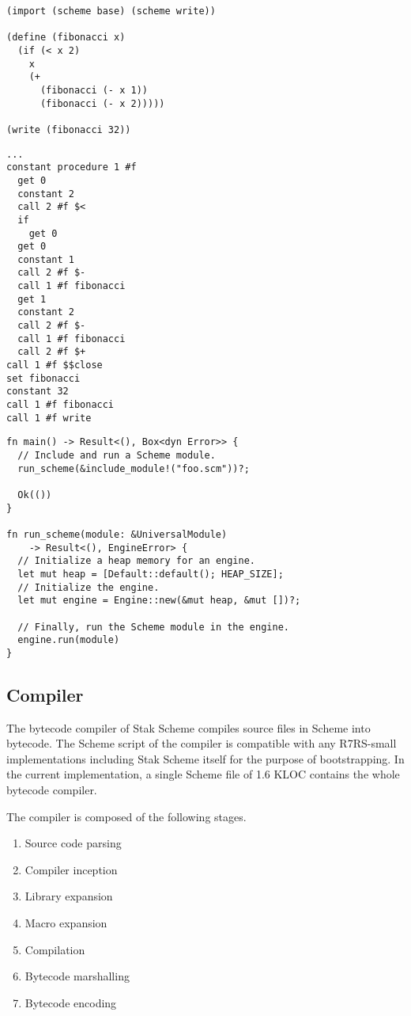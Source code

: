 \documentclass[sigplan]{acmart}
\begin{document}
\begin{lstlisting}[float, caption=\texttt{foo.scm} file, label=list:scheme]
(import (scheme base) (scheme write))

(define (fibonacci x)
  (if (< x 2)
    x
    (+
      (fibonacci (- x 1))
      (fibonacci (- x 2)))))

(write (fibonacci 32))
\end{lstlisting}

\begin{lstlisting}[float, caption=Disassembled \texttt{foo.bc} file, label=list:bytecode]
...
constant procedure 1 #f
  get 0
  constant 2
  call 2 #f $<
  if
    get 0
  get 0
  constant 1
  call 2 #f $-
  call 1 #f fibonacci
  get 1
  constant 2
  call 2 #f $-
  call 1 #f fibonacci
  call 2 #f $+
call 1 #f $$close
set fibonacci
constant 32
call 1 #f fibonacci
call 1 #f write
\end{lstlisting}

\begin{lstlisting}[float, caption=\texttt{main.rs} file, label=list:rust]
fn main() -> Result<(), Box<dyn Error>> {
  // Include and run a Scheme module.
  run_scheme(&include_module!("foo.scm"))?;

  Ok(())
}

fn run_scheme(module: &UniversalModule)
    -> Result<(), EngineError> {
  // Initialize a heap memory for an engine.
  let mut heap = [Default::default(); HEAP_SIZE];
  // Initialize the engine.
  let mut engine = Engine::new(&mut heap, &mut [])?;

  // Finally, run the Scheme module in the engine.
  engine.run(module)
}
\end{lstlisting}

\subsection{Compiler} \label{compiler}

The bytecode compiler of Stak Scheme compiles source files in Scheme
into bytecode.
The Scheme script of the compiler is compatible with any R7RS-small
implementations including Stak Scheme itself for the purpose of bootstrapping.
In the current implementation, a single Scheme file of 1.6 KLOC
contains the whole bytecode compiler.

The compiler is composed of the following stages.

\begin{enumerate}
  \item Source code parsing
  \item Compiler inception
  \item Library expansion
  \item Macro expansion
  \item Compilation
  \item Bytecode marshalling
  \item Bytecode encoding
\end{enumerate}
\end{document}
